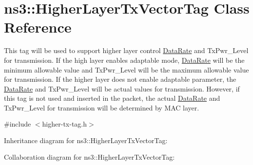 \hypertarget{classns3_1_1HigherLayerTxVectorTag}{}\section{ns3\+:\+:Higher\+Layer\+Tx\+Vector\+Tag Class Reference}
\label{classns3_1_1HigherLayerTxVectorTag}


This tag will be used to support higher layer control \hyperlink{classns3_1_1DataRate}{Data\+Rate} and Tx\+Pwr\+\_\+\+Level for transmission. If the high layer enables adaptable mode, \hyperlink{classns3_1_1DataRate}{Data\+Rate} will be the minimum allowable value and Tx\+Pwr\+\_\+\+Level will be the maximum allowable value for transmission. If the higher layer does not enable adaptable parameter, the \hyperlink{classns3_1_1DataRate}{Data\+Rate} and Tx\+Pwr\+\_\+\+Level will be actual values for transmission. However, if this tag is not used and inserted in the packet, the actual \hyperlink{classns3_1_1DataRate}{Data\+Rate} and Tx\+Pwr\+\_\+\+Level for transmission will be determined by M\+AC layer.  




{\ttfamily \#include $<$higher-\/tx-\/tag.\+h$>$}



Inheritance diagram for ns3\+:\+:Higher\+Layer\+Tx\+Vector\+Tag\+:


Collaboration diagram for ns3\+:\+:Higher\+Layer\+Tx\+Vector\+Tag\+:
